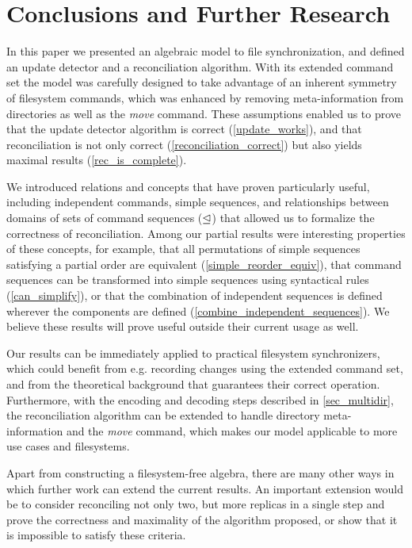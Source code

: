 
\section{Conclusions and Further Research}

In this paper we presented an algebraic model to file synchronization,
and defined an update detector and a reconciliation algorithm.
With its extended command set the model was carefully designed to take
advantage of an inherent symmetry of filesystem commands,
which was enhanced by removing meta-information from directories
as well as the \emph{move} command.
These assumptions enabled us to prove that
the update detector algorithm is correct (\cref{update_works}),
and that reconciliation is not only correct (\cref{reconciliation_correct})
but also yields maximal results (\cref{rec_is_complete}).

We introduced relations and concepts that have proven particularly
useful, including 
independent commands, %
simple sequences, %
and relationships between domains of sets of command sequences ($\trianglelefteq$)
that allowed us to formalize the correctness of reconciliation.
Among our partial results were interesting properties of these concepts,
for example,
that all permutations of simple sequences satisfying a partial order are equivalent (\cref{simple_reorder_equiv}),
that command sequences can be transformed into simple sequences using syntactical rules (\cref{can_simplify}),
or that the combination of independent sequences is defined wherever the components are defined (\cref{combine_independent_sequences}).
We believe these results will prove useful outside their current usage as well.

Our results can be immediately applied to practical filesystem synchronizers,
which could benefit from e.g. recording changes using the extended command set,
and from the theoretical background that guarantees their correct operation.
Furthermore, with the encoding and decoding steps described in \cref{sec_multidir},
the reconciliation algorithm can be extended to handle directory meta-information
and the \emph{move} command,
which makes our model applicable to more use cases and filesystems.

\myskip
Apart from constructing a filesystem-free algebra,
there are many other ways in which further work can extend the current results.
An important extension would be to
consider reconciling not only two, but more replicas in a single step and
prove the correctness and maximality of the algorithm proposed,
or show that it is impossible to satisfy these criteria.


